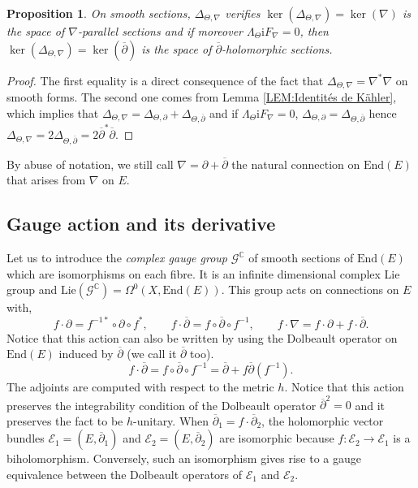 \documentclass{article}
\newtheorem{proposition}[theorem]{Proposition}
\theoremstyle{remark}
\theoremstyle{definition}
\newcommand{\C}{\mathbb{C}}
\newcommand{\End}{\mathrm{End}}
\newcommand{\Lie}{\mathrm{Lie}}
\renewcommand{\i}{\boldsymbol{\mathrm{i}}}
\newcommand{\E}{\mathcal{E}}
\newcommand{\G}{\mathcal{G}}
\newcommand{\dbar}{\overline{\partial}}
\begin{document}
\begin{proposition}\label{PRO:Noyau Laplacien}
    On smooth sections, $\Delta_{\Theta,\nabla}$ verifies $\ker(\Delta_{\Theta,\nabla}) = \ker(\nabla)$ is the space of $\nabla$-parallel sections and if moreover $\Lambda_\Theta\i F_\nabla = 0$, then $\ker(\Delta_{\Theta,\nabla}) = \ker(\dbar)$ is the space of $\dbar$-holomorphic sections.
\end{proposition}
\begin{proof}
The first equality is a direct consequence of the fact that $\Delta_{\Theta,\nabla} = \nabla^*\nabla$ on smooth forms. The second one comes from Lemma \ref{LEM:Identités de Kähler}, which implies that $\Delta_{\Theta,\nabla} = \Delta_{\Theta,\partial} + \Delta_{\Theta,\dbar}$ and if $\Lambda_\Theta\i F_\nabla = 0$, $\Delta_{\Theta,\partial} = \Delta_{\Theta,\dbar}$ hence $\Delta_{\Theta,\nabla} = 2\Delta_{\Theta,\dbar} = 2\dbar^*\dbar$.
\end{proof}

By abuse of notation, we still call $\nabla = \partial + \dbar$ the natural connection on $\End(E)$ that arises from $\nabla$ on $E$.

\subsection{Gauge action and its derivative}

Let us to introduce the \textit{complex gauge group} $\G^\C$ of smooth sections of $\End(E)$ which are isomorphisms on each fibre. It is an infinite dimensional complex Lie group and $\Lie(\G^\C) = \Omega^0(X,\End(E))$. This group acts on connections on $E$ with,
$$
f \cdot \partial = f^{-1*} \circ \partial \circ f^*, \qquad f \cdot \dbar = f \circ \dbar \circ f^{-1}, \qquad f \cdot \nabla = f \cdot \partial + f \cdot \dbar.
$$
Notice that this action can also be written by using the Dolbeault operator on $\End(E)$ induced by $\dbar$ (we call it $\dbar$ too).
\begin{equation}\label{EQ:Action de gauge}
    f \cdot \dbar = f \circ \dbar \circ f^{-1} = \dbar + f\dbar(f^{-1}).
\end{equation}
The adjoints are computed with respect to the metric $h$. Notice that this action preserves the integrability condition of the Dolbeault operator $\dbar^2 = 0$ and it preserves the fact to be $h$-unitary. When $\dbar_1 = f \cdot \dbar_2$, the holomorphic vector bundles $\E_1 = (E,\dbar_1)$ and $\E_2 = (E,\dbar_2)$ are isomorphic because $f : \E_2 \rightarrow \E_1$ is a biholomorphism. Conversely, such an isomorphism gives rise to a gauge equivalence between the Dolbeault operators of $\E_1$ and $\E_2$.
\end{document}
